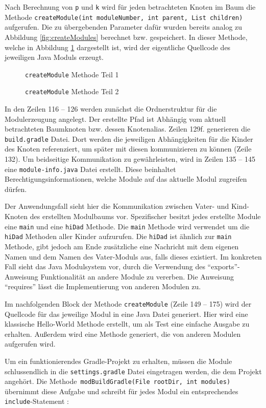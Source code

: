 Nach Berechnung von \texttt{p} und \texttt{k} wird für jeden betrachteten Knoten im Baum die Methode \texttt{createModule(int moduleNumber, int parent, List children)} aufgerufen.
Die zu übergebenden Parameter dafür wurden bereits analog zu Abbildung \ref{fig:createModules} berechnet bzw. gespeichert. 
In dieser Methode, welche in Abbildung \ref{fig:createModule} dargestellt ist, wird der eigentliche Quellcode des jeweiligen Java Moduls erzeugt.

\begin{figure} [b!]
	
	\caption{\texttt{createModule} Methode Teil 1}
\end{figure}

\begin{figure} [t!] \ContinuedFloat
	
	\caption{\texttt{createModule} Methode Teil 2}
	\label{fig:createModule}
\end{figure}

In den Zeilen 116 – 126 werden zunächst die Ordnerstruktur für die Modulerzeugung angelegt. 
Der erstellte Pfad ist Abhängig vom aktuell betrachteten Baumknoten bzw. dessen Knotenalias. 
Zeilen 129f. generieren die \texttt{build.gradle} Datei. 
Dort werden die jeweiligen Abhängigkeiten für die Kinder des Knoten referenziert, um später mit diesen kommunizieren zu können (Zeile 132). 
Um beidseitige Kommunikation zu gewährleisten, wird in Zeilen 135 – 145 eine \texttt{module-info.java} Datei erstellt. 
Diese beinhaltet Berechtigungsinformationen, welche Module auf das aktuelle Modul zugreifen dürfen.
 
Der Anwendungsfall sieht hier die Kommunikation zwischen Vater- und Kind-Knoten des erstellten Modulbaums vor. 
Spezifischer besitzt jedes erstellte Module eine \texttt{main} und eine \texttt{hiDad} Methode.
Die \texttt{main} Methode wird verwendet um die \texttt{hiDad} Methoden aller Kinder aufzurufen.
Die \texttt{hiDad} ist ähnlich zur \texttt{main} Methode, gibt jedoch am Ende zusätzliche eine Nachricht mit dem eigenen Namen und dem Namen des Vater-Moduls aus, falls dieses existiert.
Im konkreten Fall sieht das Java Modulsystem vor, durch die Verwendung des \enquote{exports}-Anweisung Funktionalität an andere Module zu vererben. 
Die Anweisung \enquote{requires} lässt die Implementierung von anderen Modulen zu. 

Im nachfolgenden Block der Methode \texttt{createModule} (Zeile 149 – 175) wird der Quellcode für das jeweilige Modul in eine Java Datei generiert. 
Hier wird eine klassische Hello-World Methode erstellt, um als Test eine einfache Ausgabe zu erhalten. 
Außerdem wird eine Methode generiert, die von anderen Modulen aufgerufen wird.

Um ein funktionierendes Gradle-Projekt zu erhalten, müssen die Module schlussendlich in die \texttt{settings.gradle} Datei eingetragen werden, die dem Projekt angehört. 
Die Methode\texttt{ modBuildGradle(File rootDir, int modules)} übernimmt diese Aufgabe und schreibt für jedes Modul ein entsprechendes \texttt{include}-Statement :